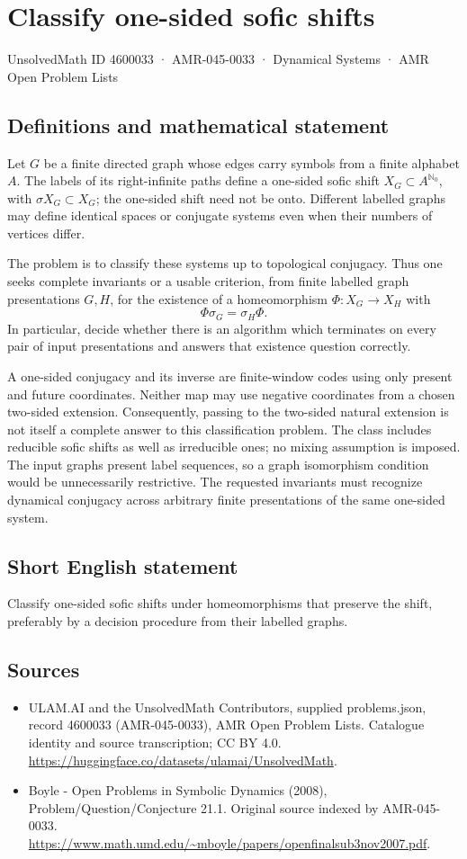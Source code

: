 \documentclass[11pt,a4paper]{article}
\begin{document}
\section*{Classify one-sided sofic shifts}\label{4600033}
{\small UnsolvedMath ID 4600033 · AMR-045-0033 · Dynamical Systems · AMR Open Problem Lists}
\subsection{Definitions and mathematical statement}
Let $G$ be a finite directed graph whose edges carry symbols from a
finite alphabet $A$. The labels of its right-infinite paths define a
one-sided sofic shift $X_G\subset A^{\mathbb N_0}$, with
$\sigma X_G\subset X_G$; the one-sided shift need not be onto.
Different labelled graphs may define identical spaces or conjugate
systems even when their numbers of vertices differ.

The problem is to classify these systems up to topological conjugacy.
Thus one seeks complete invariants or a usable criterion, from finite
labelled graph presentations $G,H$, for the existence of a
homeomorphism $\Phi:X_G\to X_H$ with
\[
                     \Phi\sigma_G=\sigma_H\Phi.
\]
In particular, decide whether there is an algorithm which terminates
on every pair of input presentations and answers that existence
question correctly.

A one-sided conjugacy and its inverse are finite-window codes using
only present and future coordinates. Neither map may use negative
coordinates from a chosen two-sided extension. Consequently, passing
to the two-sided natural extension is not itself a complete answer
to this classification problem. The class includes reducible sofic
shifts as well as irreducible ones; no mixing assumption is imposed.
The input graphs present label sequences, so a graph isomorphism
condition would be unnecessarily restrictive. The requested invariants
must recognize dynamical conjugacy across arbitrary finite
presentations of the same one-sided system.
\subsection{Short English statement}
Classify one-sided sofic shifts under homeomorphisms that preserve the shift, preferably by a decision procedure from their labelled graphs.
\subsection{Sources}
\begin{itemize}
\item[S1] ULAM.AI and the UnsolvedMath Contributors, supplied problems.json, record 4600033 (AMR-045-0033), AMR Open Problem Lists. Catalogue identity and source transcription; CC BY 4.0.
\url{https://huggingface.co/datasets/ulamai/UnsolvedMath}.
\item[S2] Boyle - Open Problems in Symbolic Dynamics (2008), Problem/Question/Conjecture 21.1. Original source indexed by AMR-045-0033.
\url{https://www.math.umd.edu/~mboyle/papers/openfinalsub3nov2007.pdf}.
\end{itemize}
\end{document}
